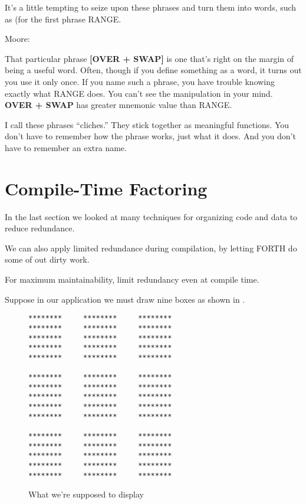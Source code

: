 It's a little tempting to seize upon these phrases and turn them into words, such as (for the first phrase RANGE.

\bigskip
\blackline{2ex}
\noindent Moore:

\begin{tfquot}
That particular phrase \textbf{[OVER + SWAP]} is one that's right on the margin of being a useful word. Often, though if you define something as a word, it turns out you use it only once. If you name such a phrase, you have trouble knowing exactly what RANGE does. You can't see the manipulation in your mind. \textbf{OVER + SWAP} has greater mnemonic value than RANGE.
\end{tfquot}
\blackline{1ex}
I call these phrases ``cliches.'' They stick together as meaningful functions. You don't have to remember how the phrase works, just what it does. And you don't have to remember an extra name.

\section{{Compile-Time Factoring}}

\noindent
In the last section we looked at many techniques for organizing code and data to reduce redundance.

We can also apply limited redundance during compilation, by letting FORTH do some of out dirty work.

\begin{tip}
For maximum maintainability, limit redundancy even at compile time.
\end{tip}
Suppose in our application we must draw nine boxes as shown in .

\begin{figure*}[tttt]
\caption{What we're supposed to display}
\begin{center}
\begin{BVerbatim}
********     ********     ********
********     ********     ********
********     ********     ********
********     ********     ********
********     ********     ********

********     ********     ********
********     ********     ********
********     ********     ********
********     ********     ********
********     ********     ********

********     ********     ********
********     ********     ********
********     ********     ********
********     ********     ********
********     ********     ********
\end{BVerbatim}
\end{center}
\end{figure*}

